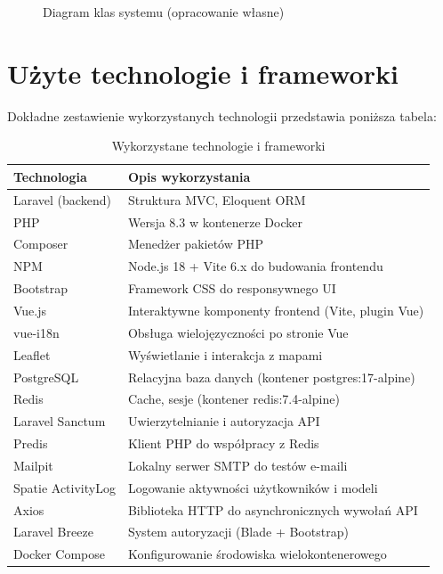 \documentclass[12pt,a4paper]{article}
\begin{document}
\newpage

\begin{figure}[H]
    \centering
    \caption{Diagram klas systemu (opracowanie własne)}
    \label{fig:diagram-klas}
\end{figure}

\newpage

\section{Użyte technologie i frameworki}

Dokładne zestawienie wykorzystanych technologii przedstawia poniższa tabela:

\begin{table}[H]
\centering
\begin{tabular}{@{}p{4cm}p{8cm}@{}}
\toprule
\textbf{Technologia} & \textbf{Opis wykorzystania} \\
\midrule
Laravel (backend) & Struktura MVC, Eloquent ORM \\
PHP & Wersja 8.3 w kontenerze Docker \\
Composer & Menedżer pakietów PHP \\
NPM & Node.js 18 + Vite 6.x do budowania frontendu \\
Bootstrap & Framework CSS do responsywnego UI \\
Vue.js & Interaktywne komponenty frontend (Vite, plugin Vue) \\
vue-i18n & Obsługa wielojęzyczności po stronie Vue \\
Leaflet & Wyświetlanie i interakcja z mapami \\
PostgreSQL & Relacyjna baza danych (kontener postgres:17-alpine) \\
Redis & Cache, sesje (kontener redis:7.4-alpine) \\
Laravel Sanctum & Uwierzytelnianie i autoryzacja API \\
Predis & Klient PHP do współpracy z Redis \\
Mailpit & Lokalny serwer SMTP do testów e-maili \\
Spatie ActivityLog & Logowanie aktywności użytkowników i modeli \\
Axios & Biblioteka HTTP do asynchronicznych wywołań API \\
Laravel Breeze & System autoryzacji (Blade + Bootstrap) \\
Docker Compose & Konfigurowanie środowiska wielokontenerowego \\
\bottomrule
\end{tabular}
\caption{Wykorzystane technologie i frameworki}
\end{table}
\end{document}
